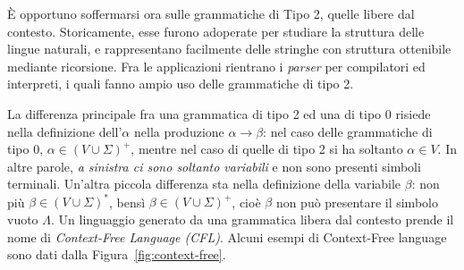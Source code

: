 \documentclass[10pt]{\classname}
\theoremstyle{definition}
\theoremstyle{definition}
\theoremstyle{definition}
\theoremstyle{definition}
\begin{document}
È opportuno soffermarsi ora sulle grammatiche di Tipo 2, quelle libere dal
contesto. Storicamente, esse furono adoperate per studiare la struttura delle
lingue naturali, e rappresentano facilmente delle stringhe con struttura
ottenibile mediante ricorsione. Fra le applicazioni rientrano i \emph{parser}
per compilatori ed interpreti, i quali fanno ampio uso delle grammatiche di
tipo 2.

La differenza principale fra una grammatica di tipo 2 ed una di tipo 0 risiede nella definizione dell'$\alpha$ nella produzione $\alpha \rightarrow \beta$: nel caso delle grammatiche di tipo 0, $\alpha \in (V \cup \Sigma)^+$, mentre nel caso di quelle di tipo 2 si ha soltanto $\alpha \in V$. In altre parole, \emph{a sinistra ci sono soltanto variabili} e non sono presenti simboli terminali. Un'altra piccola differenza sta nella definizione della variabile $\beta$: non più $\beta \in (V \cup \Sigma)^*$, bensì $\beta \in (V \cup \Sigma)^+$, cioè $\beta$ non può presentare il simbolo vuoto $\Lambda$. Un linguaggio generato da una grammatica libera dal contesto prende il nome di \emph{Context-Free Language (CFL)}. Alcuni esempi di Context-Free language sono dati dalla Figura~\ref{fig:context-free}.
\end{document}
